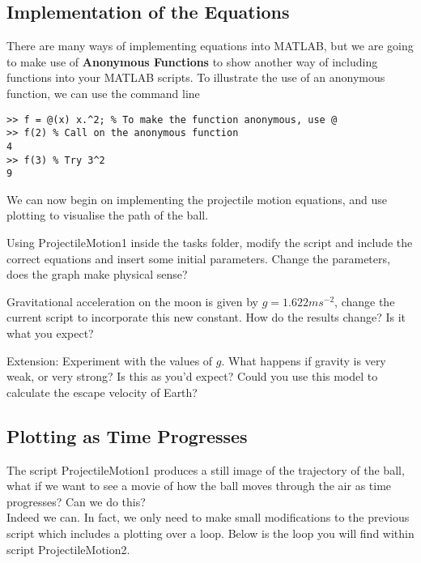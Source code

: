 \documentclass[12pt]{report}
\begin{document}
\subsection*{Implementation of the Equations}
There are many ways of implementing equations into MATLAB, but we are going to make use of \textbf{Anonymous Functions} to show another way of including functions into your MATLAB scripts. To illustrate the use of an anonymous function, we can use the command line
\begin{lstlisting}
>> f = @(x) x.^2; % To make the function anonymous, use @
>> f(2) % Call on the anonymous function
4
>> f(3) % Try 3^2
9
\end{lstlisting}
We can now begin on implementing the projectile motion equations, and use plotting to visualise the path of the ball.\\
 
\begin{tcolorbox}[title=Task (Moderate)]
Using ProjectileMotion1 inside the tasks folder, modify the script and include the correct equations and insert some initial parameters. Change the parameters, does the graph make physical sense?
\end{tcolorbox}

\begin{tcolorbox}[title=Task (Easy)]
Gravitational acceleration on the moon is given by $g = 1.622ms^{-2}$, change the current script to incorporate this new constant. How do the results change? Is it what you expect?

\tcblower

Extension: Experiment with the values of $g$. What happens if gravity is very weak, or very strong? Is this as you'd expect? Could you use this model to calculate the escape velocity of Earth?

\end{tcolorbox}

\subsection*{Plotting as Time Progresses}
The script ProjectileMotion1 produces a still image of the trajectory of the ball, what if we want to see a movie of how the ball moves through the air as time progresses? Can we do this?\\

\noindent Indeed we can. In fact, we only need to make small modifications to the previous script which includes a plotting over a loop. Below is the loop you will find within script ProjectileMotion2.
\end{document}
